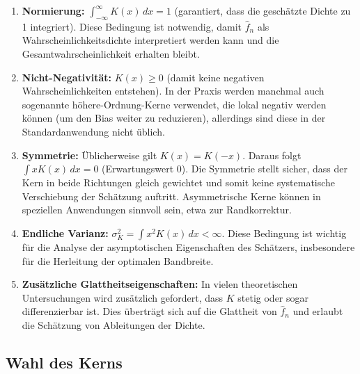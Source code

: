 \documentclass[a4paper, 11pt]{scrartcl}
\begin{document}
\begin{enumerate}
	\item \textbf{Normierung:} $\int_{-\infty}^{\infty} K(x) \, dx = 1$ (garantiert, dass die geschätzte Dichte zu 1 integriert). Diese Bedingung ist notwendig, damit $\hat{f}_n$ als Wahrscheinlichkeitsdichte interpretiert werden kann und die Gesamtwahrscheinlichkeit erhalten bleibt.
	\item \textbf{Nicht-Negativität:} $K(x) \ge 0$ (damit keine negativen Wahrscheinlichkeiten entstehen). In der Praxis werden manchmal auch sogenannte höhere-Ordnung-Kerne verwendet, die lokal negativ werden können (um den Bias weiter zu reduzieren), allerdings sind diese in der Standardanwendung nicht üblich.
	\item \textbf{Symmetrie:} Üblicherweise gilt $K(x) = K(-x)$. Daraus folgt $\int x K(x) \, dx = 0$ (Erwartungswert 0). Die Symmetrie stellt sicher, dass der Kern in beide Richtungen gleich gewichtet und somit keine systematische Verschiebung der Schätzung auftritt. Asymmetrische Kerne können in speziellen Anwendungen sinnvoll sein, etwa zur Randkorrektur.
	\item \textbf{Endliche Varianz:} $\sigma_K^2 = \int x^2 K(x) \, dx < \infty$. Diese Bedingung ist wichtig für die Analyse der asymptotischen Eigenschaften des Schätzers, insbesondere für die Herleitung der optimalen Bandbreite.
	\item \textbf{Zusätzliche Glattheitseigenschaften:} In vielen theoretischen Untersuchungen wird zusätzlich gefordert, dass $K$ stetig oder sogar differenzierbar ist. Dies überträgt sich auf die Glattheit von $\hat{f}_n$ und erlaubt die Schätzung von Ableitungen der Dichte.
\end{enumerate}

\subsection{Wahl des Kerns}
\end{document}
